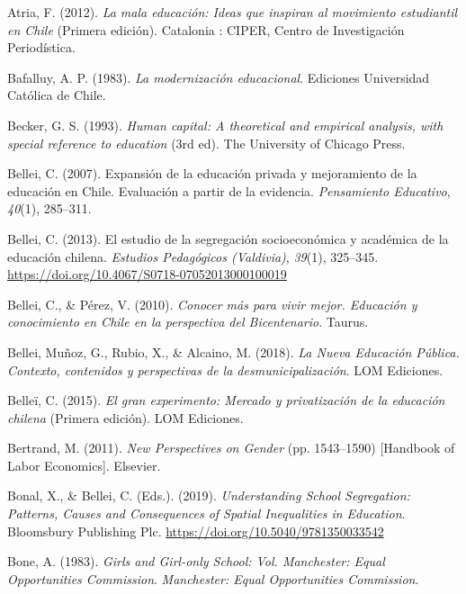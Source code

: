 \documentclass[
]{article}
\begin{document}
\leavevmode\hypertarget{ref-atria_mala_2012}{}%
Atria, F. (2012). \emph{La mala educación: Ideas que inspiran al
movimiento estudiantil en Chile} (Primera edición). Catalonia : CIPER,
Centro de Investigación Periodística.

\leavevmode\hypertarget{ref-bafalluy_modernizacion_1983}{}%
Bafalluy, A. P. (1983). \emph{La modernización educacional}. Ediciones
Universidad Católica de Chile.

\leavevmode\hypertarget{ref-becker_human_1993}{}%
Becker, G. S. (1993). \emph{Human capital: A theoretical and empirical
analysis, with special reference to education} (3rd ed). The University
of Chicago Press.

\leavevmode\hypertarget{ref-bellei_expansion_2007}{}%
Bellei, C. (2007). Expansión de la educación privada y mejoramiento de
la educación en Chile. Evaluación a partir de la evidencia.
\emph{Pensamiento Educativo}, \emph{40}(1), 285--311.

\leavevmode\hypertarget{ref-bellei_estudio_2013}{}%
Bellei, C. (2013). El estudio de la segregación socioeconómica y
académica de la educación chilena. \emph{Estudios Pedagógicos
(Valdivia)}, \emph{39}(1), 325--345.
\url{https://doi.org/10.4067/S0718-07052013000100019}

\leavevmode\hypertarget{ref-bellei_conocer_2010}{}%
Bellei, C., \& Pérez, V. (2010). \emph{Conocer más para vivir mejor.
Educación y conocimiento en Chile en la perspectiva del Bicentenario}.
Taurus.

\leavevmode\hypertarget{ref-bellei_nueva_2018}{}%
Bellei, Muñoz, G., Rubio, X., \& Alcaino, M. (2018). \emph{La Nueva
Educación Pública. Contexto, contenidos y perspectivas de la
desmunicipalización}. LOM Ediciones.

\leavevmode\hypertarget{ref-bellei_gran_2015}{}%
Belleï, C. (2015). \emph{El gran experimento: Mercado y privatización de
la educación chilena} (Primera edición). LOM Ediciones.

\leavevmode\hypertarget{ref-bertrand_new_2011}{}%
Bertrand, M. (2011). \emph{New Perspectives on Gender} (pp. 1543--1590)
{[}Handbook of Labor Economics{]}. Elsevier.

\leavevmode\hypertarget{ref-bonal_understanding_2019b}{}%
Bonal, X., \& Bellei, C. (Eds.). (2019). \emph{Understanding School
Segregation: Patterns, Causes and Consequences of Spatial Inequalities
in Education}. Bloomsbury Publishing Plc.
\url{https://doi.org/10.5040/9781350033542}

\leavevmode\hypertarget{ref-bone_girls_1983}{}%
Bone, A. (1983). \emph{Girls and Girl-only School: Vol. Manchester:
Equal Opportunities Commission}. \emph{Manchester: Equal Opportunities
Commission}.
\end{document}
